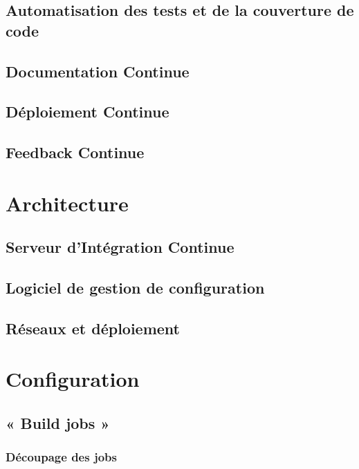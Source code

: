 \documentclass{report}
\begin{document}
        \subsection{Automatisation des tests et de la couverture de code}

        \subsection{Documentation Continue}

        \subsection{Déploiement Continue}

        \subsection{Feedback Continue}

      \section{Architecture}

        \subsection{Serveur d’Intégration Continue}

        \subsection{Logiciel de gestion de configuration}

        \subsection{Réseaux et déploiement}

      \section{Configuration}

        \subsection{« Build jobs »}

          \subsubsection{Découpage des jobs}
\end{document}
